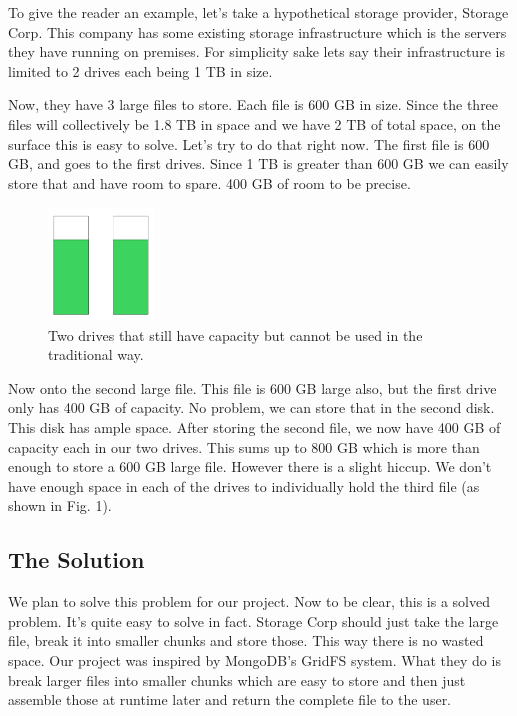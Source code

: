 \documentclass[conference]{IEEEtran}
\begin{document}
To give the reader an example, let's take a hypothetical storage provider, Storage Corp.
This company has some existing storage infrastructure which is the servers they have running on premises.
For simplicity sake lets say their infrastructure is limited to 2 drives each being 1 TB in size.

Now, they have 3 large files to store. Each file is 600 GB in size.
Since the three files will collectively be 1.8 TB in space and we have 2 TB of total space,
on the surface this is easy to solve.
Let's try to do that right now. The first file is 600 GB, and goes to the first drives.
Since 1 TB is greater than 600 GB we can easily store that and have room to spare.
400 GB of room to be precise.

\begin{figure}[h]
\caption{Two drives that still have capacity but cannot be used in the traditional way.}
\centering
\includegraphics[width=0.25\textwidth]{database.png}
\end{figure}

Now onto the second large file. This file is 600 GB large also, but the first drive only has 400 GB of capacity.
No problem, we can store that in the second disk.
This disk has ample space.
After storing the second file, we now have 400 GB of capacity each in our two drives.
This sums up to 800 GB which is more than enough to store a 600 GB large file.
However there is a slight hiccup.
We don't have enough space in each of the drives to individually hold the third file (as shown in Fig. 1).

\subsection{The Solution}
We plan to solve this problem for our project.
Now to be clear, this is a solved problem.
It's quite easy to solve in fact.
Storage Corp should just take the large file, break it into smaller chunks and store those.
This way there is no wasted space.
Our project was inspired by MongoDB's GridFS system.
What they do is break larger files into smaller chunks which are easy to store and then just assemble those at runtime later and return the complete file to the user.
\end{document}
